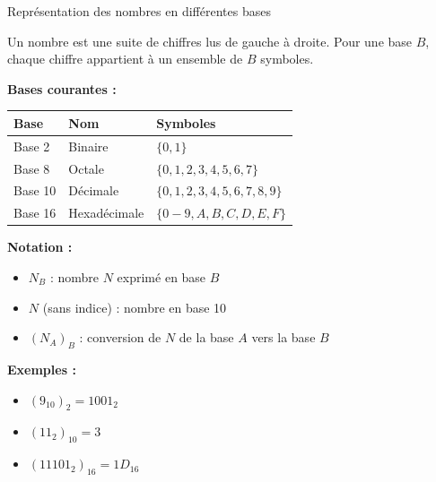\documentclass[aspectratio=1610]{beamer}
\begin{document}
\begin{frame}{Représentation des nombres en différentes bases}

  Un nombre est une suite de chiffres lus de gauche à droite. Pour une base $B$, chaque chiffre appartient à un ensemble de $B$ symboles.

  \vspace{0.5em}

  \textbf{Bases courantes :}

  \begin{center}
    \begin{tabular}{lll}
      \hline
      \textbf{Base} & \textbf{Nom} & \textbf{Symboles} \\
      \hline
      Base 2  & Binaire    & $\{0, 1\}$ \\
      Base 8  & Octale     & $\{0, 1, 2, 3, 4, 5, 6, 7\}$ \\
      Base 10 & Décimale   & $\{0, 1, 2, 3, 4, 5, 6, 7, 8, 9\}$ \\
      Base 16 & Hexadécimale & $\{0{-}9, A, B, C, D, E, F\}$ \\
      \hline
    \end{tabular}
  \end{center}

  \vspace{0.5em}

  \pause
  \textbf{Notation :}
  \begin{itemize}
    \item $N_B$ : nombre $N$ exprimé en base $B$
    \item $N$ (sans indice) : nombre en base 10
    \item $(N_A)_B$ : conversion de $N$ de la base $A$ vers la base $B$
  \end{itemize}

  \vspace{0.5em}

  \pause
  \textbf{Exemples :}
  \begin{itemize}
    \item $(9_{10})_2 = 1001_2$
    \item $(11_2)_{10} = 3$
    \item $(11101_2)_{16} = 1D_{16}$
  \end{itemize}

\end{frame}
\end{document}

